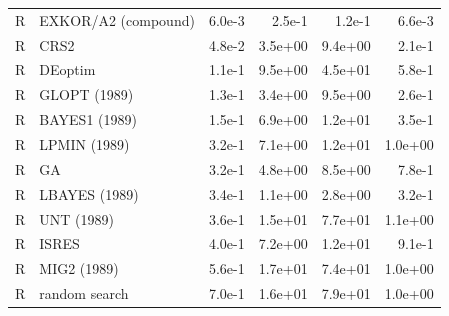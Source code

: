 \begin{tabular}{llrrrr}
R & EXKOR/A2 (compound) & 6.0e-3 & 2.5e-1 & 1.2e-1 & 6.6e-3 \\
R & CRS2 & 4.8e-2 & 3.5e+00 & 9.4e+00 & 2.1e-1 \\
R & DEoptim & 1.1e-1 & 9.5e+00 & 4.5e+01 & 5.8e-1 \\
R & GLOPT (1989) & 1.3e-1 & 3.4e+00 & 9.5e+00 & 2.6e-1 \\
R & BAYES1 (1989) & 1.5e-1 & 6.9e+00 & 1.2e+01 & 3.5e-1 \\
R & LPMIN (1989) & 3.2e-1 & 7.1e+00 & 1.2e+01 & 1.0e+00 \\
R & GA & 3.2e-1 & 4.8e+00 & 8.5e+00 & 7.8e-1 \\
R & LBAYES (1989) & 3.4e-1 & 1.1e+00 & 2.8e+00 & 3.2e-1 \\
R & UNT (1989) & 3.6e-1 & 1.5e+01 & 7.7e+01 & 1.1e+00 \\
R & ISRES & 4.0e-1 & 7.2e+00 & 1.2e+01 & 9.1e-1 \\
R & MIG2 (1989) & 5.6e-1 & 1.7e+01 & 7.4e+01 & 1.0e+00 \\
R & random search & 7.0e-1 & 1.6e+01 & 7.9e+01 & 1.0e+00 \\
\bottomrule
\end{tabular}